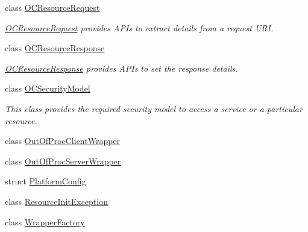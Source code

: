 \begin{DoxyCompactItemize}
class \hyperlink{classOC_1_1OCResourceRequest}{O\+C\+Resource\+Request}
\begin{DoxyCompactList}\small\item\em \hyperlink{classOC_1_1OCResourceRequest}{O\+C\+Resource\+Request} provides A\+P\+Is to extract details from a request U\+R\+I. \end{DoxyCompactList}\item 
class \hyperlink{classOC_1_1OCResourceResponse}{O\+C\+Resource\+Response}
\begin{DoxyCompactList}\small\item\em \hyperlink{classOC_1_1OCResourceResponse}{O\+C\+Resource\+Response} provides A\+P\+Is to set the response details. \end{DoxyCompactList}\item 
class \hyperlink{classOC_1_1OCSecurityModel}{O\+C\+Security\+Model}
\begin{DoxyCompactList}\small\item\em This class provides the required security model to access a service or a particular resource. \end{DoxyCompactList}\item 
class \hyperlink{classOC_1_1OutOfProcClientWrapper}{Out\+Of\+Proc\+Client\+Wrapper}
\item 
class \hyperlink{classOC_1_1OutOfProcServerWrapper}{Out\+Of\+Proc\+Server\+Wrapper}
\item 
struct \hyperlink{structOC_1_1PlatformConfig}{Platform\+Config}
\item 
class \hyperlink{classOC_1_1ResourceInitException}{Resource\+Init\+Exception}
\item 
class \hyperlink{classOC_1_1WrapperFactory}{Wrapper\+Factory}
\end{DoxyCompactItemize}
